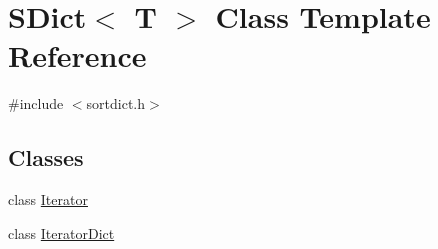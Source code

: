 \hypertarget{class_s_dict}{}\section{S\+Dict$<$ T $>$ Class Template Reference}
\label{class_s_dict}


{\ttfamily \#include $<$sortdict.\+h$>$}

\subsection*{Classes}
\begin{DoxyCompactItemize}
\item 
class \mbox{\hyperlink{class_s_dict_1_1_iterator}{Iterator}}
\item 
class \mbox{\hyperlink{class_s_dict_1_1_iterator_dict}{Iterator\+Dict}}
\end{DoxyCompactItemize}
